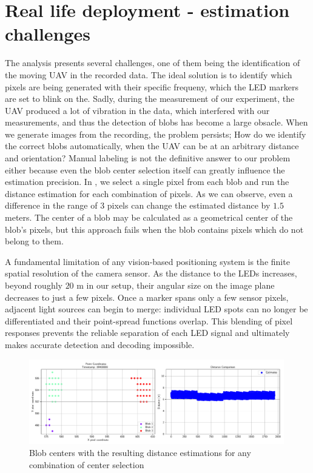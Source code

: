 \section{Real life deployment - estimation challenges}

The analysis presents several challenges, one of them being the identification of the moving \ac{UAV} in the recorded
data. The ideal solution is to identify which pixels are being generated with their specific frequeny, which the \ac{LED}
markers are set to blink on the. Sadly, during the measurement of our experiment, the \ac{UAV} produced a lot
of vibration in the data, which interfered with our measurements, and thus the detection of blobs has become a large obsacle.
When we generate images from the recording, the problem persists; How do we identify the correct blobs automatically, when
the \ac{UAV} can be at an arbitrary distance and orientation?
Manual labeling is not the definitive answer to our problem either because even the blob center selection itself can greatly
influence the estimation precision. In , we select a single pixel from each blob and run the distance estimation
for each combination of pixels. As we can observe, even a difference in the range of 3 pixels can change the estimated distance by
$1.5$ meters. The center of a blob may be calculated as a geometrical center of the blob's pixels, but this approach fails
when the blob contains pixels which do not belong to them. %

A fundamental limitation of any vision‐based positioning system is the finite spatial resolution of the camera sensor. As the distance to the \ac{LED}s increases, beyond roughly $20$ m in our setup, their angular size on the image plane decreases to just a few pixels. Once a marker spans only a few sensor pixels, adjacent light sources can begin to merge: individual \ac{LED} spots can no longer be differentiated and their point-spread functions overlap. This blending of pixel responses prevents the reliable separation of each \ac{LED} signal and ultimately makes accurate detection and decoding impossible.

\begin{figure}[H]
	\centering
	\includegraphics[width=0.99\textwidth]{./fig/pgfplot/build/estimation_selection_1.pdf}
	\caption{Blob centers with the resulting distance estimations for any combination of center selection}
	\label{fig:blob_comb}
\end{figure}

